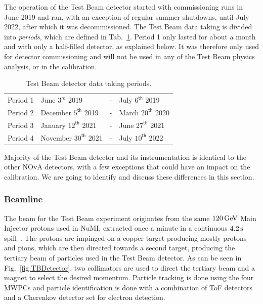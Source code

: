 
The operation of the Test Beam detector started with commissioning runs in June 2019 and ran, with an exception of regular summer shutdowns, until July 2022, after which it was decommissioned. The Test Beam data taking is divided into \textit{periods}, which are defined in Tab.~\ref{tab:TestBeamPeriods}. Period 1 only lasted for about a month and with only a half-filled detector, as explained below. It was therefore only used for detector commissioning and will not be used in any of the Test Beam physics analysis, or in the calibration.
\begin{table}[!ht]
\centering
\caption{Test Beam detector data taking periods.}
\def\arraystretch{1.4}
\begin{tabular}{l@{\hskip 1in}lcl}
Period 1 & June $3^{\textsf{rd}}$ 2019 & - & July $6^{\textsf{th}}$ 2019\\
Period 2 & December $5^{\textsf{th}}$ 2019 & - & March $20^{\textsf{th}}$ 2020\\
Period 3 & January $12^{\textsf{th}}$ 2021 & - & June $27^{\textsf{th}}$ 2021\\
Period 4 & November $30^{\textsf{th}}$ 2021 & - & July $10^{\textsf{th}}$ 2022
\end{tabular}
\label{tab:TestBeamPeriods}
\end{table}

Majority of the Test Beam detector and its instrumentation is identical to the other \gls{NOvA} detectors, with a few exceptions that could have an impact on the calibration. We are going to identify and discuss these differences in this section.


\subsubsection*{Beamline}
The beam for the Test Beam experiment originates from the same $\unit[120]{GeV}$ Main Injector protons used in \gls{NuMI}, extracted once a minute in a continuous $\unit[4.2]{s}$ spill~\cite{NOvATestBeamWallbangProceedings2020.pdf}. The protons are impinged on a copper target producing mostly protons and pions, which are then directed towards a second target, producing the tertiary beam of particles used in the Test Beam detector. As can be seen in Fig.~\ref{fig:TBDetector}, two collimators are used to direct the tertiary beam and a magnet to select the desired momentum. Particle tracking is done using the four \glspl{MWPC} and particle identification is done with a combination of \gls{ToF} detectors and a Cherenkov detector set for electron detection.

